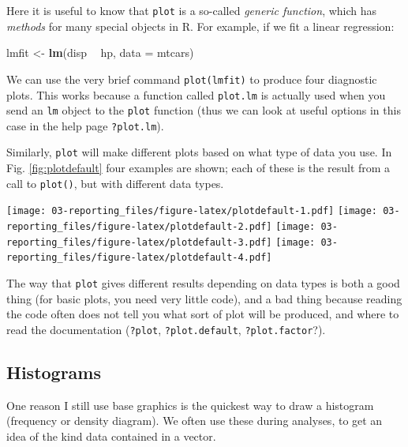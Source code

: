 \documentclass[]{book}
\newenvironment{Shaded}{\begin{snugshade}}{\end{snugshade}}
\newcommand{\DataTypeTok}[1]{\textcolor[rgb]{0.13,0.29,0.53}{#1}}
\newcommand{\KeywordTok}[1]{\textcolor[rgb]{0.13,0.29,0.53}{\textbf{#1}}}
\newcommand{\NormalTok}[1]{#1}
\newcommand{\OperatorTok}[1]{\textcolor[rgb]{0.81,0.36,0.00}{\textbf{#1}}}
\newcommand{\StringTok}[1]{\textcolor[rgb]{0.31,0.60,0.02}{#1}}
\begin{document}
Here it is useful to know that \texttt{plot} is a so-called \emph{generic function}, which has \emph{methods} for many special objects in R. For example, if we fit a linear regression:

\begin{Shaded}
\begin{Highlighting}[]
\NormalTok{lmfit <-}\StringTok{ }\KeywordTok{lm}\NormalTok{(disp }\OperatorTok{~}\StringTok{ }\NormalTok{hp, }\DataTypeTok{data =}\NormalTok{ mtcars)}
\end{Highlighting}
\end{Shaded}

We can use the very brief command \texttt{plot(lmfit)} to produce four diagnostic plots. This works because a function called \texttt{plot.lm} is actually used when you send an \texttt{lm} object to the \texttt{plot} function (thus we can look at useful options in this case in the help page \texttt{?plot.lm}).

Similarly, \texttt{plot} will make different plots based on what type of data you use. In Fig. \ref{fig:plotdefault} four examples are shown; each of these is the result from a call to \texttt{plot()}, but with different data types.

\texttt{[image: 03-reporting\_files/figure-latex/plotdefault-1.pdf]} \texttt{[image: 03-reporting\_files/figure-latex/plotdefault-2.pdf]} \texttt{[image: 03-reporting\_files/figure-latex/plotdefault-3.pdf]} \texttt{[image: 03-reporting\_files/figure-latex/plotdefault-4.pdf]}

The way that \texttt{plot} gives different results depending on data types is both a good thing (for basic plots, you need very little code), and a bad thing because reading the code often does not tell you what sort of plot will be produced, and where to read the documentation (\texttt{?plot}, \texttt{?plot.default}, \texttt{?plot.factor}?).

\hypertarget{hist}{%
\subsection{Histograms}\label{hist}}

One reason I still use base graphics is the quickest way to draw a histogram (frequency or density diagram). We often use these during analyses, to get an idea of the kind data contained in a vector.
\end{document}

